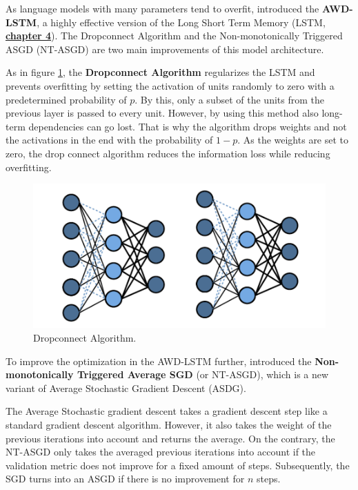 \documentclass[]{krantz}
\begin{document}
As language models with many parameters tend to overfit, \citet{merity2017} introduced the \textbf{AWD-LSTM}, a highly effective version of the Long Short Term Memory (LSTM, \protect\hyperlink{recurrent-neural-networks-and-their-applications-in-nlp}{\textbf{chapter 4}}). The Dropconnect Algorithm and the Non-monotonically Triggered ASGD (NT-ASGD) are two main improvements of this model architecture.

As in figure \ref{fig:ch21-drop}, the \textbf{Dropconnect Algorithm} \citep{wan2013} regularizes the LSTM and prevents overfitting by setting the activation of units randomly to zero with a predetermined probability of \(p\). By this, only a subset of the units from the previous layer is passed to every unit. However, by using this method also long-term dependencies can go lost. That is why the algorithm drops weights and not the activations in the end with the probability of \(1-p\). As the weights are set to zero, the drop connect algorithm reduces the information loss while reducing overfitting.

\begin{figure}

{\centering \includegraphics[width=0.5\linewidth]{figures/02-01-transfer-learning-for-nlp-1/ulmfit-dropconnect} 

}

\caption{Dropconnect Algorithm.}\label{fig:ch21-drop}
\end{figure}

To improve the optimization in the AWD-LSTM further, \citet{merity2017} introduced the \textbf{Non-monotonically Triggered Average SGD} (or NT-ASGD), which is a new variant of Average Stochastic Gradient Descent (ASDG).

The Average Stochastic gradient descent takes a gradient descent step like a standard gradient descent algorithm. However, it also takes the weight of the previous iterations into account and returns the average. On the contrary, the NT-ASGD only takes the averaged previous iterations into account if the validation metric does not improve for a fixed amount of steps. Subsequently, the SGD turns into an ASGD if there is no improvement for \(n\) steps.
\end{document}
